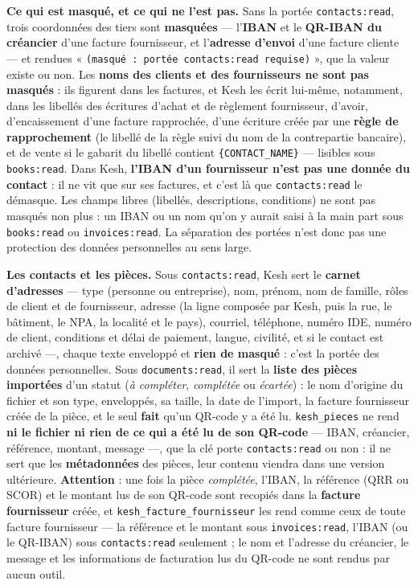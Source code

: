 \documentclass[a4paper,11pt,oneside]{article}
\begin{document}
\textbf{Ce qui est masqué, et ce qui ne l'est pas.} Sans la portée \texttt{contacts:read}, trois coordonnées des tiers sont \textbf{masquées} --- l'\textbf{IBAN} et le \textbf{QR-IBAN du créancier} d'une facture fournisseur, et l'\textbf{adresse d'envoi} d'une facture cliente --- et rendues « \texttt{(masqué : portée contacts:read requise)} », que la valeur existe ou non. Les \textbf{noms des clients et des fournisseurs ne sont pas masqués} : ils figurent dans les factures, et Kesh les écrit lui-même, notamment, dans les libellés des écritures d'achat et de règlement fournisseur, d'avoir, d'encaissement d'une facture rapprochée, d'une écriture créée par une \textbf{règle de rapprochement} (le libellé de la règle suivi du nom de la contrepartie bancaire), et de vente si le gabarit du libellé contient \texttt{\{CONTACT\_NAME\}} --- lisibles sous \texttt{books:read}. Dans Kesh, \textbf{l'IBAN d'un fournisseur n'est pas une donnée du contact} : il ne vit que sur ses factures, et c'est là que \texttt{contacts:read} le démasque. Les champs libres (libellés, descriptions, conditions) ne sont pas masqués non plus : un IBAN ou un nom qu'on y aurait saisi à la main part sous \texttt{books:read} ou \texttt{invoices:read}. La séparation des portées n'est donc pas une protection des données personnelles au sens large.

\textbf{Les contacts et les pièces.} Sous \texttt{contacts:read}, Kesh sert le \textbf{carnet d'adresses} --- type (personne ou entreprise), nom, prénom, nom de famille, rôles de client et de fournisseur, adresse (la ligne composée par Kesh, puis la rue, le bâtiment, le NPA, la localité et le pays), courriel, téléphone, numéro IDE, numéro de client, conditions et délai de paiement, langue, civilité, et si le contact est archivé ---, chaque texte enveloppé et \textbf{rien de masqué} : c'est la portée des données personnelles. Sous \texttt{documents:read}, il sert la \textbf{liste des pièces importées} d'un statut (\emph{à compléter}, \emph{complétée} ou \emph{écartée}) : le nom d'origine du fichier et son type, enveloppés, sa taille, la date de l'import, la facture fournisseur créée de la pièce, et le seul \textbf{fait} qu'un QR-code y a été lu. \texttt{kesh\_pieces} ne rend \textbf{ni le fichier ni rien de ce qui a été lu de son QR-code} --- IBAN, créancier, référence, montant, message ---, que la clé porte \texttt{contacts:read} ou non : il ne sert que les \textbf{métadonnées} des pièces, leur contenu viendra dans une version ultérieure. \textbf{Attention} : une fois la pièce \emph{complétée}, l'IBAN, la référence (QRR ou SCOR) et le montant lus de son QR-code sont recopiés dans la \textbf{facture fournisseur} créée, et \texttt{kesh\_facture\_fournisseur} les rend comme ceux de toute facture fournisseur --- la référence et le montant sous \texttt{invoices:read}, l'IBAN (ou le QR-IBAN) sous \texttt{contacts:read} seulement ; le nom et l'adresse du créancier, le message et les informations de facturation lus du QR-code ne sont rendus par aucun outil.
\end{document}

